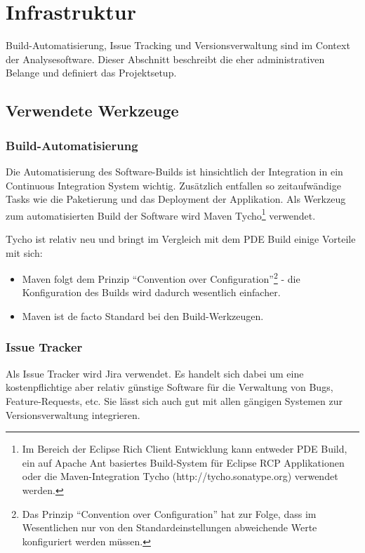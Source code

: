 \chapter{Infrastruktur}\label{konzept_3}
Build-Automatisierung, Issue Tracking und Versionsverwaltung sind im Context der Analysesoftware. Dieser Abschnitt beschreibt die eher administrativen Belange und definiert das Projektsetup. 

\section{Verwendete Werkzeuge}
\subsection{Build-Automatisierung}
Die Automatisierung des Software-Builds ist hinsichtlich der Integration in ein Continuous Integration System wichtig. Zusätzlich entfallen so zeitaufwändige Tasks wie die Paketierung und das Deployment der Applikation.
Als Werkzeug zum automatisierten Build der Software wird Maven Tycho\footnote{Im Bereich der Eclipse Rich Client Entwicklung kann entweder PDE Build, ein auf Apache Ant basiertes Build-System für Eclipse RCP Applikationen\cite{vogelZapfPdeBuild} oder die Maven-Integration Tycho (http://tycho.sonatype.org) verwendet werden.} verwendet.

Tycho ist relativ neu und bringt im Vergleich mit dem PDE Build einige Vorteile mit sich:
\begin{itemize}
	\item Maven folgt dem Prinzip ``Convention over Configuration''\footnote{Das Prinzip ``Convention over Configuration'' hat zur Folge, dass im Wesentlichen nur von den Standardeinstellungen abweichende Werte konfiguriert werden müssen.} - die Konfiguration des Builds wird dadurch wesentlich einfacher.
	\item Maven ist de facto Standard bei den Build-Werkzeugen.
\end{itemize}

\subsection{Issue Tracker}\label{issue_tracker}
Als Issue Tracker wird Jira verwendet. Es handelt sich dabei um eine kostenpflichtige aber relativ günstige Software für die Verwaltung von Bugs, Feature-Requests, etc. Sie lässt sich auch gut mit allen gängigen Systemen zur Versionsverwaltung integrieren.

